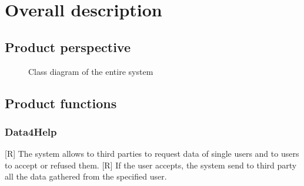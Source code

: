 \chapter{Overall description}

\section{Product perspective}





\begin{figure}[H]
    \centering
    \caption{ Class diagram of the entire system}
    \label{fig:class-diagram}
\end{figure}

\section{Product functions}



\subsection{Data4Help }
[R] The system allows to third parties to request data of single users and to users to accept or refused them. 
    [R] If the user accepts, the system send to third party all the data gathered from the specified user.

